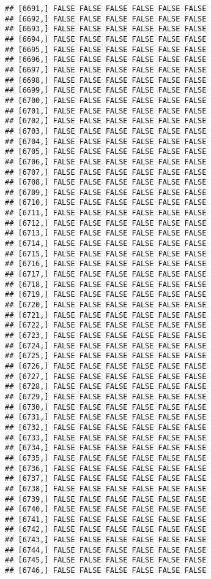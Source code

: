 \documentclass[
]{article}
\begin{document}
\begin{verbatim}
## [6691,] FALSE FALSE FALSE FALSE FALSE FALSE
## [6692,] FALSE FALSE FALSE FALSE FALSE FALSE
## [6693,] FALSE FALSE FALSE FALSE FALSE FALSE
## [6694,] FALSE FALSE FALSE FALSE FALSE FALSE
## [6695,] FALSE FALSE FALSE FALSE FALSE FALSE
## [6696,] FALSE FALSE FALSE FALSE FALSE FALSE
## [6697,] FALSE FALSE FALSE FALSE FALSE FALSE
## [6698,] FALSE FALSE FALSE FALSE FALSE FALSE
## [6699,] FALSE FALSE FALSE FALSE FALSE FALSE
## [6700,] FALSE FALSE FALSE FALSE FALSE FALSE
## [6701,] FALSE FALSE FALSE FALSE FALSE FALSE
## [6702,] FALSE FALSE FALSE FALSE FALSE FALSE
## [6703,] FALSE FALSE FALSE FALSE FALSE FALSE
## [6704,] FALSE FALSE FALSE FALSE FALSE FALSE
## [6705,] FALSE FALSE FALSE FALSE FALSE FALSE
## [6706,] FALSE FALSE FALSE FALSE FALSE FALSE
## [6707,] FALSE FALSE FALSE FALSE FALSE FALSE
## [6708,] FALSE FALSE FALSE FALSE FALSE FALSE
## [6709,] FALSE FALSE FALSE FALSE FALSE FALSE
## [6710,] FALSE FALSE FALSE FALSE FALSE FALSE
## [6711,] FALSE FALSE FALSE FALSE FALSE FALSE
## [6712,] FALSE FALSE FALSE FALSE FALSE FALSE
## [6713,] FALSE FALSE FALSE FALSE FALSE FALSE
## [6714,] FALSE FALSE FALSE FALSE FALSE FALSE
## [6715,] FALSE FALSE FALSE FALSE FALSE FALSE
## [6716,] FALSE FALSE FALSE FALSE FALSE FALSE
## [6717,] FALSE FALSE FALSE FALSE FALSE FALSE
## [6718,] FALSE FALSE FALSE FALSE FALSE FALSE
## [6719,] FALSE FALSE FALSE FALSE FALSE FALSE
## [6720,] FALSE FALSE FALSE FALSE FALSE FALSE
## [6721,] FALSE FALSE FALSE FALSE FALSE FALSE
## [6722,] FALSE FALSE FALSE FALSE FALSE FALSE
## [6723,] FALSE FALSE FALSE FALSE FALSE FALSE
## [6724,] FALSE FALSE FALSE FALSE FALSE FALSE
## [6725,] FALSE FALSE FALSE FALSE FALSE FALSE
## [6726,] FALSE FALSE FALSE FALSE FALSE FALSE
## [6727,] FALSE FALSE FALSE FALSE FALSE FALSE
## [6728,] FALSE FALSE FALSE FALSE FALSE FALSE
## [6729,] FALSE FALSE FALSE FALSE FALSE FALSE
## [6730,] FALSE FALSE FALSE FALSE FALSE FALSE
## [6731,] FALSE FALSE FALSE FALSE FALSE FALSE
## [6732,] FALSE FALSE FALSE FALSE FALSE FALSE
## [6733,] FALSE FALSE FALSE FALSE FALSE FALSE
## [6734,] FALSE FALSE FALSE FALSE FALSE FALSE
## [6735,] FALSE FALSE FALSE FALSE FALSE FALSE
## [6736,] FALSE FALSE FALSE FALSE FALSE FALSE
## [6737,] FALSE FALSE FALSE FALSE FALSE FALSE
## [6738,] FALSE FALSE FALSE FALSE FALSE FALSE
## [6739,] FALSE FALSE FALSE FALSE FALSE FALSE
## [6740,] FALSE FALSE FALSE FALSE FALSE FALSE
## [6741,] FALSE FALSE FALSE FALSE FALSE FALSE
## [6742,] FALSE FALSE FALSE FALSE FALSE FALSE
## [6743,] FALSE FALSE FALSE FALSE FALSE FALSE
## [6744,] FALSE FALSE FALSE FALSE FALSE FALSE
## [6745,] FALSE FALSE FALSE FALSE FALSE FALSE
## [6746,] FALSE FALSE FALSE FALSE FALSE FALSE

\end{verbatim}
\end{document}
